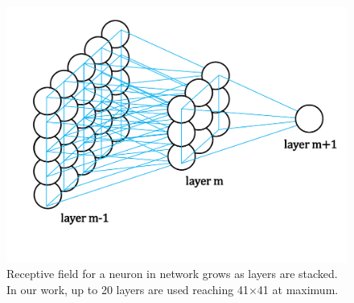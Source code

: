 \documentclass[10pt,twocolumn,letterpaper]{article}
\begin{document}
\begin{figure}
\vspace{-1cm}
\centering
\includegraphics[scale=0.3]{figs/fig4_sffsr.pdf}
\vspace{-0.7cm}
\caption{Receptive field for a neuron in network grows as layers are stacked. In our work, up to 20 layers are used reaching 41$\times$41 at maximum. }
\label{fig:receptive_field}
\end{figure}
\end{document}
